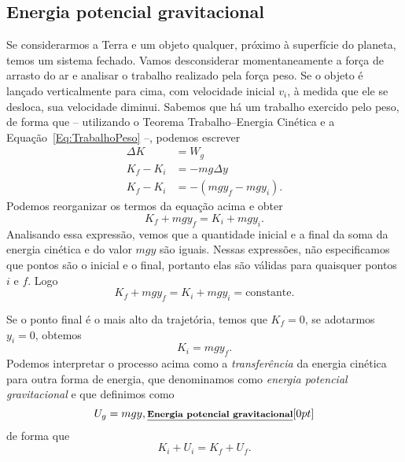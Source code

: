
\subsection{Energia potencial gravitacional}

Se considerarmos a Terra e um objeto qualquer, próximo à superfície do planeta, temos um sistema fechado. Vamos desconsiderar momentaneamente a força de arrasto do ar e analisar o trabalho realizado pela força peso. Se o objeto é lançado verticalmente para cima, com velocidade inicial $v_i$, à medida que ele se desloca, sua velocidade diminui. Sabemos que há um trabalho exercido pelo peso, de forma que -- utilizando o Teorema Trabalho--Energia Cinética e a Equação~\ref{Eq:TrabalhoPeso} --, podemos escrever
\begin{align}
  \Delta K &= W_g \\
  K_f - K_i &=  -mg\Delta y \\
  K_f - K_i &=  -(mgy_f - mgy_i).
\end{align}
%
Podemos reorganizar os termos da equação acima e obter
\begin{equation}
  K_f + mgy_f = K_i + mgy_i.
\end{equation}
%
Analisando essa expressão, vemos que a quantidade inicial e a final da soma da energia cinética e do valor $mgy$ são iguais. Nessas expressões, não especificamos que pontos são o inicial e o final, portanto elas são válidas para quaisquer pontos $i$ e $f$. Logo
\begin{equation}
  K_f + mgy_f = K_i + mgy_i = \textrm{constante}.
\end{equation}

Se o ponto final é o mais alto da trajetória, temos que $K_f = 0$, se adotarmos $y_i = 0$, obtemos
\begin{equation}
  K_i = mgy_f.
\end{equation}
%
Podemos interpretar o processo acima como a \emph{transferência} da energia cinética para outra forma de energia, que denominamos como \emph{energia potencial gravitacional} e que definimos como
\begin{equation}
  U_g = mgy, \relax{\footnotesize\emph{\textbf{Energia potencial gravitacional}}}[0pt]
\end{equation}
%
de forma que
\begin{equation}
  K_i + U_i = K_f + U_f.
\end{equation}

